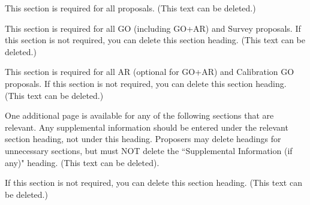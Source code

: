 \documentclass[12pt]{article}
\begin{document}
%
%
\scientificjustification          %

This section is required for all proposals. (This text can be deleted.)


%
%
\descriptionofobservations  

This section is required for all GO (including GO+AR) and Survey proposals. If this section is not required, you can delete this section heading. (This text can be deleted.)


%
%
\analysisplan 

This section is required for all AR (optional for GO+AR) and Calibration GO proposals. If this section is not required, you can delete this section heading. (This text can be deleted.)\\



\supplementalinformation %

One additional page is available for any of the following sections that are relevant. Any supplemental information should be entered under the relevant section heading,  not under this heading. Proposers may delete headings for unnecessary sections, but must NOT delete the ``Supplemental Information (if any)" heading. (This text can be deleted). 


%
%
\specialreq         

If this section is not required, you can delete this section heading. (This text can be deleted.)


%
%
\coordinatedobs 
\end{document}
